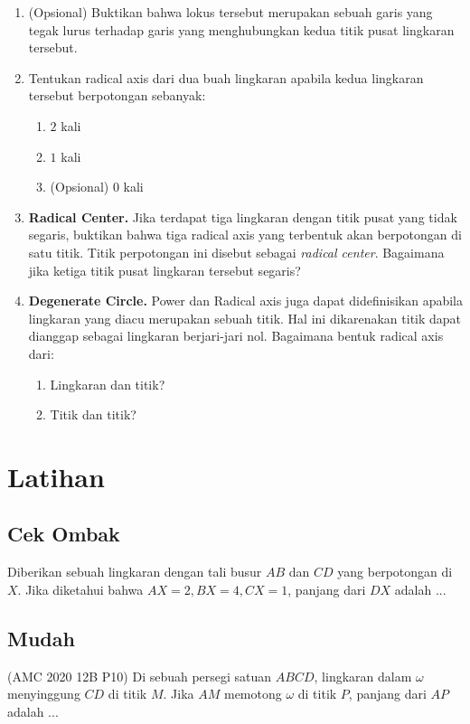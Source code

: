 \documentclass[11pt]{scrartcl}
\begin{document}
\begin{enumerate}
    \item (Opsional) Buktikan bahwa lokus tersebut merupakan sebuah garis yang tegak lurus terhadap garis yang menghubungkan kedua titik pusat lingkaran tersebut.
    \item Tentukan radical axis dari dua buah lingkaran apabila kedua lingkaran tersebut berpotongan sebanyak: 
    \begin{enumerate}
        \item $2$ kali
        \item $1$ kali
        \item (Opsional) $0$ kali
    \end{enumerate}
    \item \textbf{Radical Center.} Jika terdapat tiga lingkaran dengan titik pusat yang tidak segaris, buktikan bahwa tiga radical axis yang terbentuk akan berpotongan di satu titik. Titik perpotongan ini disebut sebagai \textit{radical center}. Bagaimana jika ketiga titik pusat lingkaran tersebut segaris?
    \item \textbf{Degenerate Circle.} Power dan Radical axis juga dapat didefinisikan apabila lingkaran yang diacu merupakan sebuah titik. Hal ini dikarenakan titik dapat dianggap sebagai lingkaran berjari-jari nol. Bagaimana bentuk radical axis dari:
    \begin{enumerate}
        \item Lingkaran dan titik?
        \item Titik dan titik?
    \end{enumerate}
\end{enumerate}

\section{Latihan}
\subsection{Cek Ombak}
\begin{problem}
    Diberikan sebuah lingkaran dengan tali busur $AB$ dan $CD$ yang berpotongan di $X$. Jika diketahui bahwa $AX = 2, BX = 4, CX = 1$, panjang dari $DX$ adalah ...
\end{problem}

\subsection{Mudah}
\begin{problem}
    (AMC 2020 12B P10) Di sebuah persegi satuan $ABCD$, lingkaran dalam $\omega$ menyinggung $CD$ di titik $M$. Jika $AM$ memotong $\omega$ di titik $P$, panjang dari $AP$ adalah ...
\end{problem}
\end{document}
